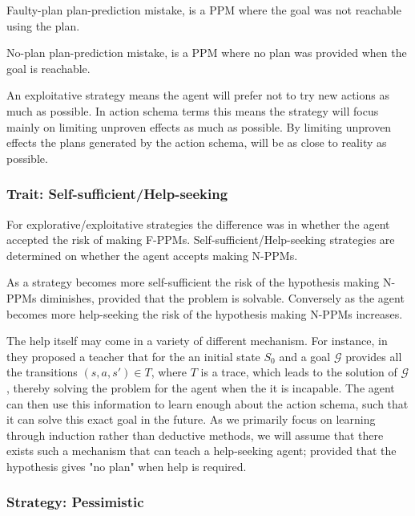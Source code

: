 \documentclass[../Master.tex]{subfiles}
\begin{document}
	\begin{definition} 
		[F-PPM] Faulty-plan plan-prediction mistake, is a PPM where the goal was not reachable using the plan.
	\end{definition}
	\begin{definition}
		[N-PPM] No-plan plan-prediction mistake, is a PPM where no plan was provided when the goal is reachable.
	\end{definition}
	An exploitative strategy means the agent will prefer not to try new actions as much as possible.
	In action schema terms this means the strategy will focus mainly on limiting unproven effects as much as possible.
	By limiting unproven effects the plans generated by the action schema, will be as close to reality as possible.




\subsubsection{Trait: Self-sufficient/Help-seeking}

	For explorative/exploitative strategies the difference was in whether the agent accepted the risk of making F-PPMs.
	Self-sufficient/Help-seeking strategies are determined on whether the agent accepts making N-PPMs.

	As a strategy becomes more self-sufficient the risk of the hypothesis making N-PPMs diminishes, provided that the problem is solvable.
	Conversely as the agent becomes more help-seeking the risk of the hypothesis making N-PPMs increases.

	The help itself may come in a variety  of different mechanism.
	For instance, in \cite{Walsh2008} they proposed a teacher that for the an initial state $S_0$ and a goal $\mathcal{G}$ provides all the transitions $(s,a,s') \in T$, where $T$ is a trace, which leads to the solution of $\mathcal{G}$,
	 thereby solving the problem for the agent when the it is incapable.
	The agent can then use this information to learn enough about the action schema, such that it can solve this exact goal in the future.
	As we primarily focus on learning through induction rather than deductive methods, we will assume that there exists such a mechanism that can teach a help-seeking agent;
	provided that the hypothesis gives "no plan" when help is required.

\subsubsection{Strategy: Pessimistic}
\end{document}
